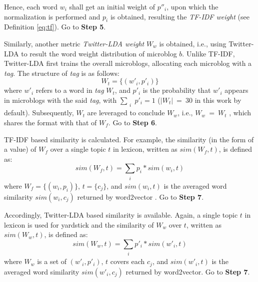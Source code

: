 Hence, each word $w_i$ shall get an initial weight of $p''_i$, upon which the normalization is performed and $p_i$ is obtained, resulting the \textit{TF-IDF weight} (see Definition \ref{eq:tf}).
Go to \textbf{Step 5}.

 Similarly, another metric \textit{Twitter-LDA weight} $W_w$ is obtained, i.e., using Twitter-LDA  %
\cite{IEEEexample:zhao2011comparing}
to result the word weight distribution of microblog $b$.
Unlike TF-IDF, Twitter-LDA first trains the overall microblogs, allocating each microblog with a \textit{tag}.
%
The structure of \textit{tag} is as follows:
\begin{equation}
\label{eq:tw-tag}
W_t = \{(w'_i, p'_i)\}
\end{equation}
where $w'_i$ refers to a word in \textit{tag} $W_t$, and $p'_i$ is the probability that $w'_i$ appears in microblogs with the said \textit{tag}, with $\sum_{\substack{i}} p'_i = 1$ ($|W_t|\ =\ 30$ in this work by default).
%
Subsequently, $W_t$ are leveraged to conclude $W_w$, i.e., $W_w\ =\ W_t$ , which shares the format with that of $W_f$.
Go to \textbf{Step 6}.

 TF-IDF based similarity is calculated.
For example, the similarity (in the form of a value) of $W_f$ over a single topic $t$ in lexicon, written as $sim(W_f, t)$, is defined as:
\begin{equation}
\label{eq:sim-tf1}
sim(W_f, t) = \sum_{\substack{i}} p_i*sim(w_i, t)
\end{equation}
where $W_f = \{(w_i, p_i)\}$, $t = \{c_j\}$, and $sim(w_i, t)$ is the averaged word similarity $sim(w_i, c_j)$ returned by word2vector \cite{IEEEexample:mikolov2013distributed}.
Go to \textbf{Step 7}.

\begin{comment}
:
\begin{equation}
\label{eq:sim-tf2}
sim(w_i, t) = \sum_{\substack{j}} sim(w_i, c_j)
\end{equation}
\end{comment}



 Accordingly, Twitter-LDA based similarity is available.
Again, a single topic $t$ in lexicon is used for yardstick and the similarity of $W_w$ over $t$, written as $sim(W_w, t)$, is defined as:
\begin{equation}
\label{eq:sim-tw1}
sim(W_w, t) = \sum_{\substack{i}} p'_i*sim(w'_i, t)
\end{equation}
where $W_w$ is a set of $(w'_i, p'_i)$, $t$ covers each $c_j$, 
and $sim(w'_i, t)$ is the averaged word similarity $sim(w'_i, c_j)$ returned by word2vector.
Go to \textbf{Step 7}.

